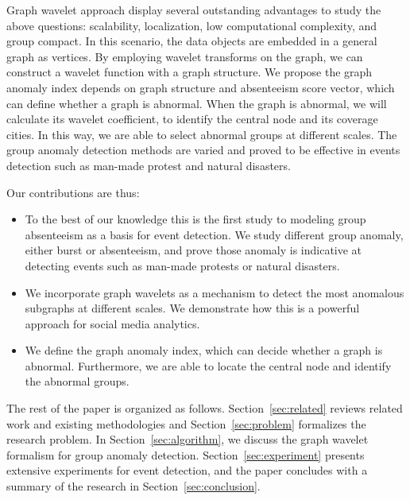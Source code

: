 \documentclass[conference]{IEEEtran}
\begin{document}
Graph wavelet approach display several outstanding advantages to study the above
questions: scalability, localization, low computational complexity, and group compact. In this scenario, the data objects are embedded in a general graph as vertices.
By employing wavelet transforms on the graph, we can construct a wavelet function with a graph structure. We propose the graph anomaly index depends on graph structure and absenteeism score vector, which can define whether a graph is abnormal. When the graph is abnormal, we will calculate its wavelet coefficient, to identify the central node and its coverage cities. In this way, we are able to select abnormal groups at different scales. The group anomaly detection methods are varied and proved to be effective in events detection such as man-made protest and natural disasters.


Our contributions are thus:
\begin{itemize}
\item To the best of our knowledge this is the first study to modeling group absenteeism as a basis for event detection. We study different group anomaly, either burst or absenteeism, and prove those anomaly is indicative at detecting events such as man-made protests or natural disasters.
\item We incorporate graph wavelets as a mechanism to detect the most anomalous subgraphs at different scales. We demonstrate how this is a powerful approach for social media analytics.
\item We define the graph anomaly index, which can decide whether a graph is abnormal. Furthermore, we are able to locate the central node and identify the abnormal groups.
\end{itemize}

The rest of the paper is organized as follows. Section~\ref{sec:related} reviews related work and existing methodologies and Section~\ref{sec:problem} formalizes the research problem. In Section~\ref{sec:algorithm}, we discuss the graph wavelet formalism for group anomaly detection.
Section~\ref{sec:experiment} presents extensive experiments for event detection, and the paper concludes with a summary of the research in Section~\ref{sec:conclusion}.
\end{document}
